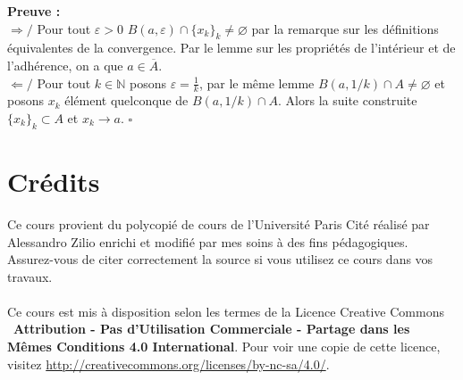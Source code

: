 \documentclass{article}
\begin{document}

\noindent {}

\noindent\textbf{Preuve :} \\
$\Rightarrow/$ Pour tout $\varepsilon > 0$ $B(a,\varepsilon) \cap \{x_k\}_k \neq \varnothing$ par la remarque sur les définitions équivalentes de la convergence. Par le lemme sur les propriétés de l'intérieur et de l'adhérence, on a que $a \in \overline{A}$. \\[0.5em]
$\Leftarrow/$ Pour tout $k \in \mathbb{N}$ posons $\varepsilon = \frac{1}{k}$, par le même lemme $B(a,1/k) \cap A \neq \varnothing$ et posons $x_k$ élément quelconque de $B(a,1/k) \cap A$. Alors la suite construite $\{x_k\}_k \subset A$ et $x_k \to a$. \hfill $\square$


\noindent {}

\newpage
\tableofcontents
\section*{Crédits}
Ce cours provient du polycopié de cours de l'Université Paris Cité réalisé par Alessandro Zilio enrichi et modifié par mes soins à des fins pédagogiques. Assurez-vous de citer correctement la source si vous utilisez ce cours dans vos travaux.\\\\
Ce cours est mis à disposition selon les termes de la Licence Creative Commons \ccbyncsa\ \textbf{Attribution - Pas d'Utilisation Commerciale - Partage dans les Mêmes Conditions 4.0 International}. 
Pour voir une copie de cette licence, visitez \url{http://creativecommons.org/licenses/by-nc-sa/4.0/}.
\end{document}
